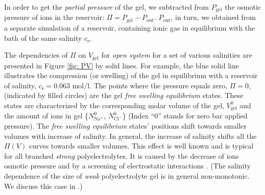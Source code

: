 \documentclass[journal,article,submit,pdftex,moreauthors]{Definitions/mdpi}
\newcommand{\Nna}{N_\mathrm{Na^+}}
\newcommand{\Ncl}{N_\mathrm{Cl^-}}
\newcommand{\cs}{c_{\mathrm{s}}}
\newcommand{\Vgel}{V_\mathrm{gel}}
\newcommand{\Pgel}{\Pi}
\newcommand{\Pout}{P_\mathrm{out}}
\begin{document}
In order to get the \emph{partial pressure} of the gel, we subtracted from $P_\mathrm{gel}$ the osmotic pressure of ions in the reservoir: $\Pgel=P_\mathrm{gel} - \Pout$.
$\Pout$, in turn, we obtained from a separate simulation of a reservoir, containing ionic gas in equilibrium with the bath of the same salinity $\cs$. 


The dependencies of $\Pgel$ on $\Vgel$ for \emph{open system} for a set of various salinities are presented
in Figure \ref{fig: PV} by solid lines. 
For example, the blue solid line illustrates the compression (or swelling) of the gel in equilibrium with a reservoir of salinity, $\cs=0.063$ mol/l. 
The points where the pressure equals zero, $\Pgel=0$, (indicated by filled circles) are the gel \emph{free swelling equilibrium} states.
These states are characterized by the corresponding molar volume of the gel, $\Vgel^0$ and the amount of ions in gel \{$\Nna^0$, $\Ncl^0$\} 
(Index ``0'' stands for zero bar applied pressure).
The \emph{free swelling equilibrium} states' positions shift towards smaller volumes with increase of salinity. 
In general, the increase of salinity shifts all the $\Pgel(V)$ curves towards smaller volumes.
This effect is well known and is typical for all branched \emph{strong} polyelectrolytes. 
It is caused by the decrease of ions osmotic pressure and by a screening of electrostatic interactions \cite{Zhulina2000, Landsgesel2020a}.
(The salinity dependence of the size of \emph{weak} polyelectrolyte gel is in general non-monotonic. We discuss this case in \cite{Rud2018}.)
\end{document}
